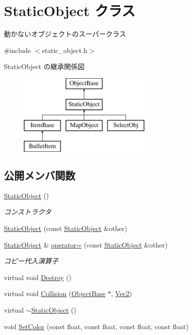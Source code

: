 \hypertarget{class_static_object}{}\section{Static\+Object クラス}
\label{class_static_object}


動かないオブジェクトのスーパークラス  




{\ttfamily \#include $<$static\+\_\+object.\+h$>$}

Static\+Object の継承関係図\begin{figure}[H]
\begin{center}
\leavevmode
\includegraphics[height=4.000000cm]{class_static_object}
\end{center}
\end{figure}
\subsection*{公開メンバ関数}
\begin{DoxyCompactItemize}
\item 
\mbox{\hyperlink{class_static_object_a2a8e918ddfe5c6723b88b9f5c4156472}{Static\+Object}} ()
\begin{DoxyCompactList}\small\item\em コンストラクタ \end{DoxyCompactList}\item 
\mbox{\hyperlink{class_static_object_a0e1518e656ce5ba408cb69f14ee3066b}{Static\+Object}} (const \mbox{\hyperlink{class_static_object}{Static\+Object}} \&other)
\item 
\mbox{\hyperlink{class_static_object}{Static\+Object}} \& \mbox{\hyperlink{class_static_object_aa2a0526bd19e479ea4d1e5da236c1bf3}{operator=}} (const \mbox{\hyperlink{class_static_object}{Static\+Object}} \&other)
\begin{DoxyCompactList}\small\item\em コピー代入演算子 \end{DoxyCompactList}\item 
virtual void \mbox{\hyperlink{class_static_object_a8e9fb321b4f8f12c4bec1bc66853512f}{Destroy}} ()
\item 
virtual void \mbox{\hyperlink{class_static_object_a64c8803ff881d578d103413e299dbf7f}{Collision}} (\mbox{\hyperlink{class_object_base}{Object\+Base}} $\ast$, \mbox{\hyperlink{common_8h_ae148fff5818e9444b4ab2288829559bf}{Vec2}})
\item 
virtual \mbox{\hyperlink{class_static_object_ac27301fc3d8d22aff5664f592c375cd8}{$\sim$\+Static\+Object}} ()
\item 
void \mbox{\hyperlink{class_static_object_a44408a8130d19f7284fe4daaab87c712}{Set\+Color}} (const float, const float, const float, const float)
\end{DoxyCompactItemize}
